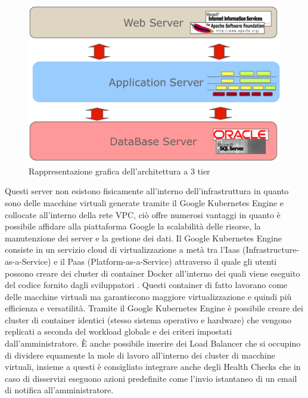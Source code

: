 \begin{figure}[ht]
    \centering\includegraphics[scale=0.23]{images/3tier.png}
    \caption{Rappresentazione grafica dell'architettura a 3 tier}
\end{figure}

Questi server non esistono fisicamente all'interno dell'infrastruttura in quanto sono delle macchine virtuali generate tramite il Google Kubernetes Engine e collocate all'interno della rete VPC, ciò offre numerosi vantaggi in quanto è possibile affidare alla piattaforma Google la scalabilità delle risorse, la manutenzione dei server e la gestione dei dati. Il Google Kubernetes Engine consiste in un servizio cloud di virtualizzazione a metà tra l'Iaas (Infrastructure-as-a-Service) e il Paas (Platform-as-a-Service) attraverso il quale gli utenti possono creare dei cluster di container Docker all'interno dei quali viene eseguito del codice fornito dagli sviluppatori \cite{Kubernetes}. Questi container di fatto lavorano come delle macchine virtuali ma garantiscono maggiore virtualizzazione e quindi più efficienza e versatilità. Tramite il Google Kubernetes Engine è possibile creare dei cluster di container identici (stesso sistema operativo e hardware) che vengono replicati a seconda del workload globale e dei criteri impostati dall'amministratore. È anche possibile inserire dei Load Balancer che si occupino di dividere equamente la mole di lavoro all'interno dei cluster di macchine virtuali, insieme a questi è consigliato integrare anche degli Health Checks che in caso di disservizi eseguono azioni predefinite come l'invio istantaneo di un email di notifica all'amministratore. 
